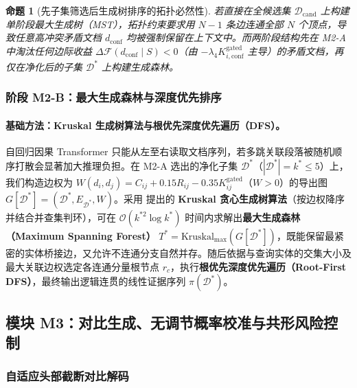 \documentclass[11pt]{article}
\newtheorem{proposition}{命题}
\begin{document}
\begin{proposition}[先子集筛选后生成树排序的拓扑必然性]
\label{prop:zh_twostage}
若直接在全候选集 $\mathcal{D}_{\text{cand}}$ 上构建单阶段最大生成树（MST），拓扑约束要求用 $N-1$ 条边连通全部 $N$ 个顶点，导致任意高冲突矛盾文档 $d_{\text{conf}}$ 均被强制保留在上下文中。而两阶段结构先在 M2-A 中淘汰任何边际收益 $\Delta \mathcal{F}(d_{\text{conf}} \mid S) < 0$（由 $-\lambda_4 K_{i,\text{conf}}^{\text{gated}}$ 主导）的矛盾文档，再仅在净化后的子集 $\mathcal{D}^*$ 上构建生成森林。
\end{proposition}

\subsubsection{阶段 M2-B：最大生成森林与深度优先排序}
\paragraph{基础方法：Kruskal 生成树算法与根优先深度优先遍历（DFS）。}
自回归因果 Transformer 只能从左至右读取文档序列，若多跳关联段落被随机顺序打散会显著加大推理负担。在 M2-A 选出的净化子集 $\mathcal{D}^*$（$|\mathcal{D}^*| = k^* \le 5$）上，我们构造边权为 $W(d_i, d_j) = C_{ij} + 0.15 R_{ij} - 0.35 K_{ij}^{\text{gated}}$（$W > 0$）的导出图 $G[\mathcal{D}^*] = (\mathcal{D}^*, E_{\mathcal{D}^*}, W)$。采用 \citet{kruskal1956shortest} 提出的 \textbf{Kruskal 贪心生成树算法}（按边权降序并结合并查集判环），可在 $\mathcal{O}(k^{*2}\log k^*)$ 时间内求解出\textbf{最大生成森林（Maximum Spanning Forest）} $T^* = \text{Kruskal}_{\max}(G[\mathcal{D}^*])$，既能保留最紧密的实体桥接边，又允许不连通分支自然并存。随后依据与查询实体的交集大小及最大关联边权选定各连通分量根节点 $r_c$，执行\textbf{根优先深度优先遍历（Root-First DFS）}，最终输出逻辑连贯的线性证据序列 $\pi(\mathcal{D}^*)$。

\subsection{模块 M3：对比生成、无调节概率校准与共形风险控制}

\subsubsection{自适应头部截断对比解码}
\end{document}
